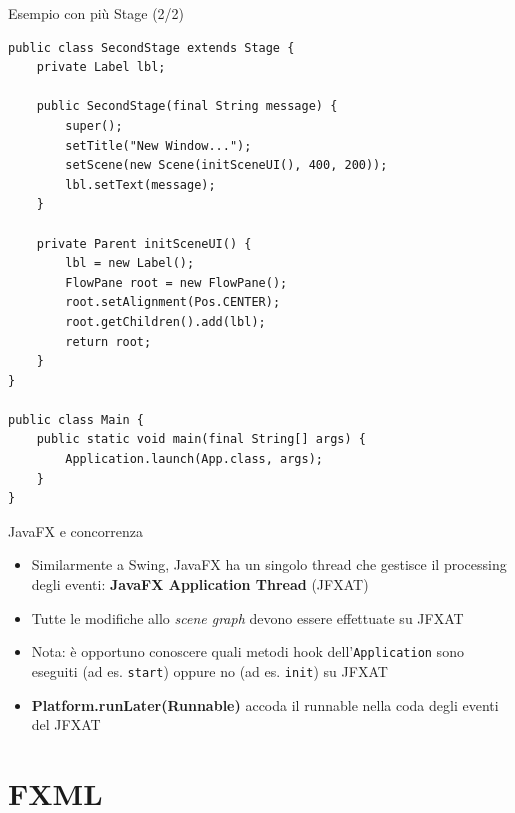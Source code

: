 \documentclass[xcolor=dvipsnames,presentation]{beamer}
\begin{document}
\begin{frame}[fragile]{Esempio con più Stage (2/2)}
\begin{lstlisting}[basicstyle=\tiny]
public class SecondStage extends Stage {
    private Label lbl;

    public SecondStage(final String message) {
        super();
	    setTitle("New Window...");
	    setScene(new Scene(initSceneUI(), 400, 200));
	    lbl.setText(message);
    }

    private Parent initSceneUI() {
        lbl = new Label();
	    FlowPane root = new FlowPane();
	    root.setAlignment(Pos.CENTER);
	    root.getChildren().add(lbl);
	    return root;
    }
}

public class Main {
    public static void main(final String[] args) {
        Application.launch(App.class, args); 
    }
}
\end{lstlisting}
\end{frame}


\begin{frame}{JavaFX e concorrenza}

\begin{itemize}
\item Similarmente a Swing, JavaFX
 ha un singolo thread che gestisce il processing degli eventi: \textbf{JavaFX Application Thread} (JFXAT)
\item Tutte le modifiche allo \emph{scene graph} devono essere effettuate su JFXAT
\item Nota: è opportuno conoscere quali metodi hook dell'\texttt{Application} sono eseguiti (ad es. \texttt{start}) oppure no (ad es. \texttt{init}) su JFXAT
\item \textbf{Platform.runLater(Runnable)}
 accoda il runnable nella coda degli eventi del JFXAT
\end{itemize}

\end{frame}


\section{FXML}
\end{document}
